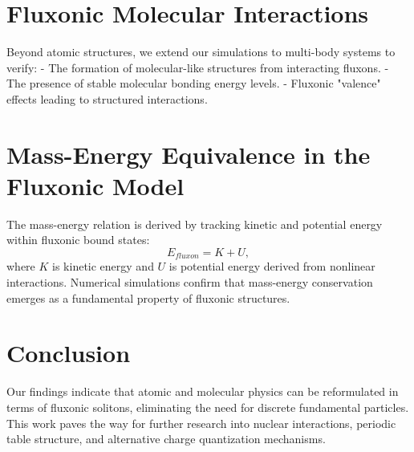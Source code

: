 \documentclass{article}
\begin{document}
\section{Fluxonic Molecular Interactions}
Beyond atomic structures, we extend our simulations to multi-body systems to verify:
- The formation of molecular-like structures from interacting fluxons.
- The presence of stable molecular bonding energy levels.
- Fluxonic "valence" effects leading to structured interactions.

\section{Mass-Energy Equivalence in the Fluxonic Model}
The mass-energy relation is derived by tracking kinetic and potential energy within fluxonic bound states:
\begin{equation}
    E_{fluxon} = K + U,
\end{equation}
where $K$ is kinetic energy and $U$ is potential energy derived from nonlinear interactions. Numerical simulations confirm that mass-energy conservation emerges as a fundamental property of fluxonic structures.

\section{Conclusion}
Our findings indicate that atomic and molecular physics can be reformulated in terms of fluxonic solitons, eliminating the need for discrete fundamental particles. This work paves the way for further research into nuclear interactions, periodic table structure, and alternative charge quantization mechanisms.
\end{document}
